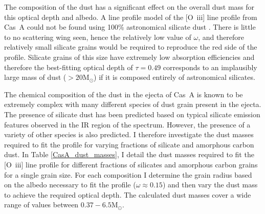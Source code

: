 The composition of the dust has a significant effect on the overall dust mass for this optical depth and albedo.  A line profile model of the [O~{\sc iii}] line profile from Cas~A could not be found using 100\% astronomical silicate dust \citep{Draine1984}.  There is little to no scattering wing seen, hence the relatively low value of $\omega$, and therefore relatively small silicate grains would be required to reproduce the red side of the profile.  Silicate grains of this size have extremely low absorption efficiencies and therefore the best-fitting optical depth of $\tau=0.49$ corresponds to an implausibly large mass of dust ($>20$M$_{\odot}$) if it is composed entirely of astronomical silicates.

The chemical composition of the dust in the ejecta of Cas~A is known to be extremely complex \citep{Arendt2014} with many different species of dust grain present in the ejecta.  The presence of silicate dust has been predicted based on typical silicate emission features observed in the IR region of the spectrum.  However, the presence of a variety of other species is also predicted.  I therefore investigate the dust masses required to fit the profile for varying fractions of silicate and amorphous carbon dust.  In Table \ref{CasA_dust_masses}, I detail the dust masses required to fit the [O~{\sc iii}] line profile for different fractions of silicates and amorphous carbon grains for a single grain size.  For each composition I determine the grain radius based on the albedo necessary to fit the profile ($\omega\approx0.15$) and then vary the dust mass to achieve the required optical depth.  The calculated dust masses cover a wide range of values between $0.37 - 6.5$M$_{\odot}$.   

